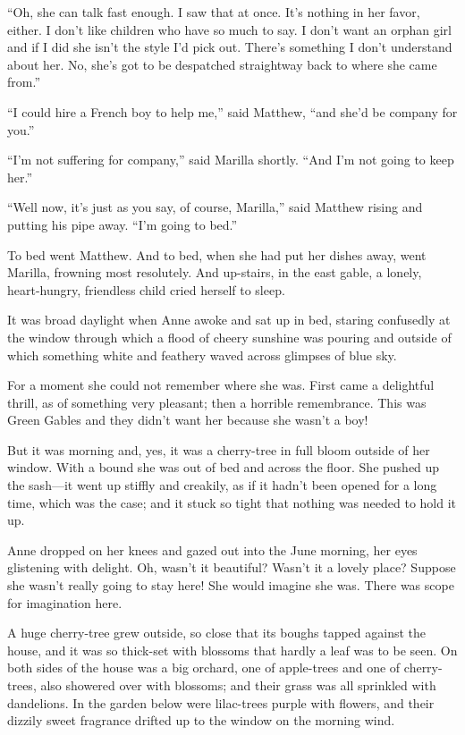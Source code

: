 \documentclass[a4paper]{article}
\begin{document}
\Large{``Oh, she can talk fast enough. I saw that at once. It's nothing in her favor, either. I don't like children who have so much to say. I don't want an orphan girl and if I did she isn't the style I'd pick out. There's something I don't understand about her. No, she's got to be despatched straightway back to where she came from.''

``I could hire a French boy to help me,'' said Matthew, ``and she'd be company for you.''

``I'm not suffering for company,'' said Marilla shortly. ``And I'm not going to keep her.''

``Well now, it's just as you say, of course, Marilla,'' said Matthew rising and putting his pipe away. ``I'm going to bed.''}

\LARGE{To bed went Matthew. And to bed, when she had put her dishes away, went Marilla, frowning most resolutely. And up-stairs, in the east gable, a lonely, heart-hungry, friendless child cried herself to sleep.

It was broad daylight when Anne awoke and sat up in bed, staring confusedly at the window through which a flood of cheery sunshine was pouring and outside of which something white and feathery waved across glimpses of blue sky.}

\huge{For a moment she could not remember where she was. First came a delightful thrill, as of something very pleasant; then a horrible remembrance. This was Green Gables and they didn't want her because she wasn't a boy!

But it was morning and, yes, it was a cherry-tree in full bloom outside of her window. With a bound she was out of bed and across the floor. She pushed up the sash---it went up stiffly and creakily, as if it hadn't been opened for a long time, which was the case; and it stuck so tight that nothing was needed to hold it up.}

\Huge{Anne dropped on her knees and gazed out into the June morning, her eyes glistening with delight. Oh, wasn't it beautiful? Wasn't it a lovely place? Suppose she wasn't really going to stay here! She would imagine she was. There was scope for imagination here.

A huge cherry-tree grew outside, so close that its boughs tapped against the house, and it was so thick-set with blossoms that hardly a leaf was to be seen. On both sides of the house was a big orchard, one of apple-trees and one of cherry-trees, also showered over with blossoms; and their grass was all sprinkled with dandelions. In the garden below were lilac-trees purple with flowers, and their dizzily sweet fragrance drifted up to the window on the morning wind.}
\end{document}
